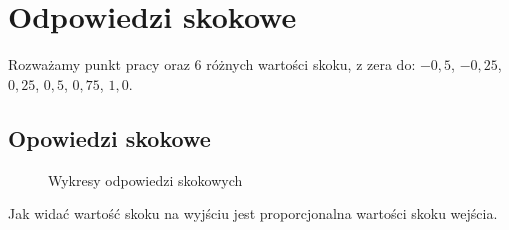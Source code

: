 \chapter{Odpowiedzi skokowe}

Rozważamy punkt pracy oraz 6 różnych wartości skoku, z zera do: $-0,5$, $-0,25$, $0,25$, $0,5$, $0,75$, $1,0$.

\section{Opowiedzi skokowe}

\begin{figure}[H]
\centering

\caption{Wykresy odpowiedzi skokowych}
\end{figure}

Jak widać wartość skoku na wyjściu jest proporcjonalna wartości skoku wejścia.


